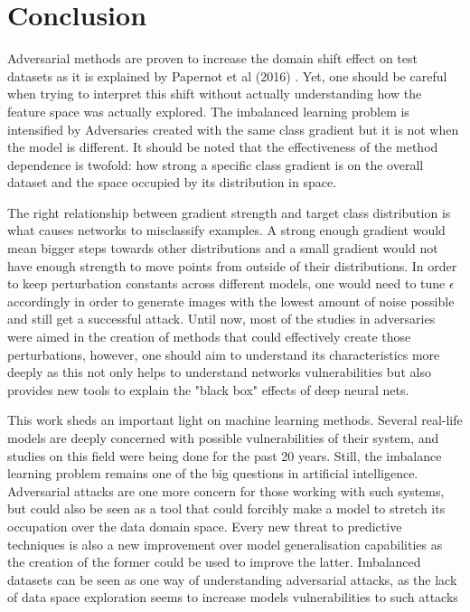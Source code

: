 \chapter{Conclusion}

Adversarial methods are proven to increase the domain shift effect on test datasets as it is explained by Papernot et al (2016) \cite{papernot2016transf}. Yet, one should be careful when trying to interpret this shift without actually understanding how the feature space was actually explored. The imbalanced learning problem is intensified by Adversaries created with the same class gradient but it is not when the model is different. It should be noted that the effectiveness of the method dependence is twofold: how strong a specific class gradient is on the overall dataset and the space occupied by its distribution in space.

The right relationship between gradient strength and target class distribution is what causes networks to misclassify examples. A strong enough gradient would mean bigger steps towards other distributions and a small gradient would not have enough strength to move points from outside of their distributions. In order to keep perturbation constants across different models, one would need to tune $\epsilon$ accordingly in order to generate images with the lowest amount of noise possible and still get a successful attack. Until now, most of the studies in adversaries were aimed in the creation of methods that could effectively create those perturbations, however, one should aim to understand its characteristics more deeply as this not only helps to understand networks vulnerabilities but also provides new tools to explain the "black box" effects of deep neural nets.

This work sheds an important light on machine learning methods. Several real-life models are deeply concerned with possible vulnerabilities of their system, and studies on this field were being done for the past 20 years. Still, the imbalance learning problem remains one of the big questions in artificial intelligence. Adversarial attacks are one more concern for those working with such systems, but could also be seen as a tool that could forcibly make a model to stretch its occupation over the data domain space. Every new threat to predictive techniques is also a new improvement over model generalisation capabilities as the creation of the former could be used to improve the latter. Imbalanced datasets can be seen as one way of understanding adversarial attacks, as the lack of data space exploration seems to increase models vulnerabilities to such attacks

